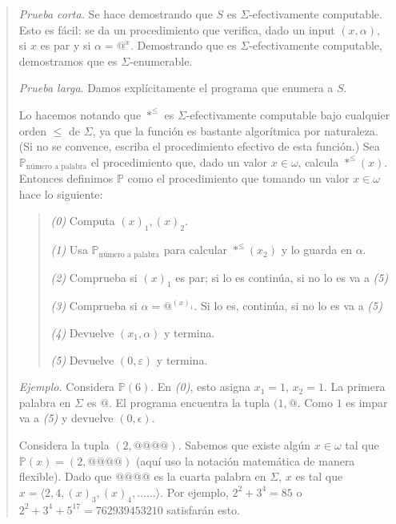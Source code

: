 \documentclass[a4paper, 12pt]{article}
\begin{document}
\small
\begin{quote}

\textit{Prueba corta.} Se hace demostrando que $S$ es $\Sigma$-efectivamente
computable. Esto es fácil: se da un procedimiento que verifica, dado un input
$(x, \alpha)$, si $x$ es par y si $\alpha = @^x$. Demostrando que es
$\Sigma$-efectivamente computable, demostramos que es $\Sigma$-enumerable.

\textit{Prueba larga}. Damos explícitamente el programa que enumera a $S$.

Lo hacemos notando que $*^{\leq}$ es $\Sigma$-efectivamente computable bajo
cualquier orden $\leq$ de $\Sigma$, ya que la función es bastante algorítmica por
naturaleza. (Si no se convence, escriba el procedimiento efectivo de esta
función.) Sea $\mathbb{P}_{\text{número a palabra}}$ el procedimiento que, dado
un valor $x \in \omega$, calcula $*^{\leq}(x)$. Entonces definimos $\mathbb{P}$
como el procedimiento que tomando un valor $x \in \omega$ hace lo siguiente:

\footnotesize
\begin{quote}
\textit{(0)} Computa $(x)_1, (x)_2$.

\textit{(1)} Usa $\mathbb{P}_{\text{número a palabra}}$ para calcular $*^{\leq}(x_2)$
y lo guarda en $\alpha$. 

\textit{(2)} Comprueba si $(x)_1$ es par; si lo es continúa, si no lo es va a
\textit{(5)}

\textit{(3)} Comprueba si $\alpha = @^{(x)_1}$. Si lo es, continúa, si no lo es
va a \textit{(5)} 

\textit{(4)} Devuelve $(x_1, \alpha)$ y termina. 

\textit{(5)} Devuelve $(0, \varepsilon)$ y termina.
\end{quote}
\small

\textit{Ejemplo.} Considera $\mathbb{P}(6)$. En \textit{(0)}, esto asigna $x_1 = 1$,
$x_2 = 1$.  La primera palabra en $\Sigma$ es $@$. El programa encuentra la
tupla $(1, @$. Como $1$ es impar va a \textit{(5)} y devuelve $(0, \epsilon)$.

Considera la tupla $(2, @@@@)$. Sabemos que existe algún $x \in \omega$ tal que
$\mathbb{P}(x) = (2, @@@@)$ (aquí uso la notación matemática de manera flexible). Dado que $@@@@$ es la cuarta palabra en $\Sigma$, $x$ es tal que
$x = \langle 2, 4, (x)_3, (x)_4, \ldots \ldots\rangle $. Por ejemplo, $2^2 + 3^4 =
85$ o $2^2 + 3^4 + 5^{17} = 762939453210$ satisfarán esto.

\end{quote}
\normalsize
\end{document}
